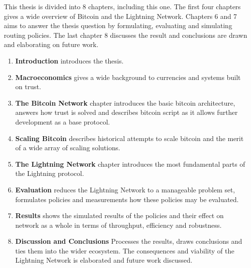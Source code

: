 This thesis is divided into 8 chapters, including this one. The first four chapters gives a wide overview of Bitcoin and the Lightning Network. Chapters 6 and 7 aims to answer the thesis question by formulating, evaluating and simulating routing policies. The last chapter 8 discusses the result and conclusions are drawn and elaborating on future work.

\begin{enumerate}
	\item \textbf{Introduction} introduces the thesis.
	\item \textbf{Macroeconomics} gives a wide background to currencies and systems built on trust. 
	\item \textbf{The Bitcoin Network} chapter introduces the basic bitcoin architecture, answers how trust is solved and describes bitcoin script as it allows further development as a base protocol.
	\item \textbf{Scaling Bitcoin} describes historical attempts to scale bitcoin and the merit of a wide array of scaling solutions.
	\item \textbf{The Lightning Network} chapter introduces the most fundamental parts of the Lightning protocol.
	\item \textbf{Evaluation} reduces the Lightning Network to a manageable problem set, formulates policies and measurements how these policies may be evaluated.
	\item \textbf{Results} shows the simulated results of the policies and their effect on network as a whole in terms of throughput, efficiency and robustness.
	\item \textbf{Discussion and Conclusions} Processes the results, draws conclusions and ties them into the wider ecosystem. The consequences and viability of the Lightning Network is elaborated and future work discussed. 
\end{enumerate}